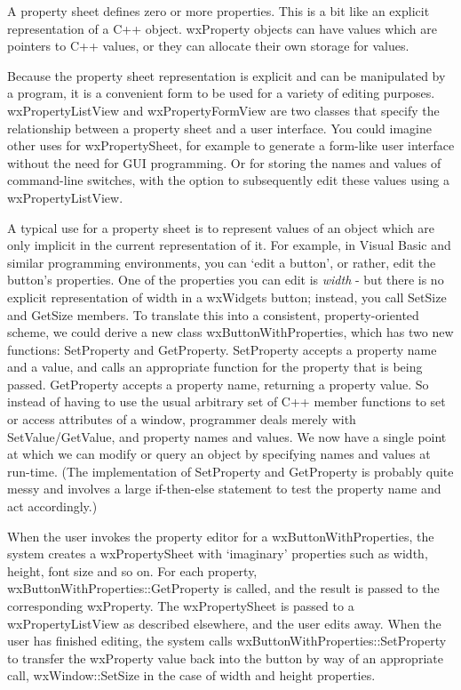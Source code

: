 A property sheet defines zero or more properties. This is a bit like an explicit representation of
a C++ object. wxProperty objects can have values which are pointers to C++ values, or they
can allocate their own storage for values.

Because the property sheet representation is explicit and can be manipulated by
a program, it is a convenient form to be used for a variety of
editing purposes. wxPropertyListView and wxPropertyFormView are two classes that
specify the relationship between a property sheet and a user interface. You could imagine
other uses for wxPropertySheet, for example to generate a form-like user interface without
the need for GUI programming. Or for storing the names and values of command-line switches, with the
option to subsequently edit these values using a wxPropertyListView.

A typical use for a property sheet is to represent values of an object
which are only implicit in the current representation of it. For
example, in Visual Basic and similar programming environments, you can
`edit a button', or rather, edit the button's properties.  One of the
properties you can edit is {\it width} - but there is no explicit
representation of width in a wxWidgets button; instead, you call SetSize
and GetSize members. To translate this into a consistent,
property-oriented scheme, we could derive a new class
wxButtonWithProperties, which has two new functions: SetProperty and
GetProperty.  SetProperty accepts a property name and a value, and calls
an appropriate function for the property that is being passed.
GetProperty accepts a property name, returning a property value. So
instead of having to use the usual arbitrary set of C++ member functions
to set or access attributes of a window, programmer deals merely with
SetValue/GetValue, and property names and values.
We now have a single point at which we can modify or query an object by specifying
names and values at run-time. (The implementation of SetProperty and GetProperty
is probably quite messy and involves a large if-then-else statement to
test the property name and act accordingly.)

When the user invokes the property editor for a wxButtonWithProperties, the system
creates a wxPropertySheet with `imaginary' properties such as width, height, font size
and so on. For each property, wxButtonWithProperties::GetProperty is called, and the result is
passed to the corresponding wxProperty. The wxPropertySheet is passed to a wxPropertyListView
as described elsewhere, and the user edits away. When the user has finished editing, the system calls
wxButtonWithProperties::SetProperty to transfer the wxProperty value back into the button
by way of an appropriate call, wxWindow::SetSize in the case of width and height properties.

